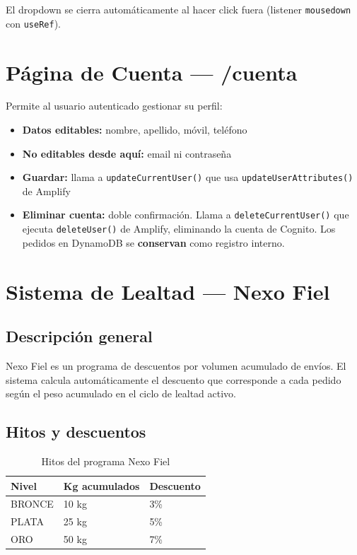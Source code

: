 \documentclass[12pt,a4paper]{article}
\begin{document}
El dropdown se cierra automáticamente al hacer click fuera (listener
\texttt{mousedown} con \texttt{useRef}).

\section{Página de Cuenta --- /cuenta}

Permite al usuario autenticado gestionar su perfil:

\begin{itemize}
  \item \textbf{Datos editables:} nombre, apellido, móvil, teléfono
  \item \textbf{No editables desde aquí:} email ni contraseña
  \item \textbf{Guardar:} llama a \texttt{updateCurrentUser()} que usa
    \texttt{updateUserAttributes()} de Amplify
  \item \textbf{Eliminar cuenta:} doble confirmación. Llama a \texttt{deleteCurrentUser()}
    que ejecuta \texttt{deleteUser()} de Amplify, eliminando la cuenta de Cognito.
    Los pedidos en DynamoDB se \textbf{conservan} como registro interno.
\end{itemize}

\section{Sistema de Lealtad --- Nexo Fiel}

\subsection{Descripción general}

Nexo Fiel es un programa de descuentos por volumen acumulado de envíos. El sistema
calcula automáticamente el descuento que corresponde a cada pedido según el peso
acumulado en el ciclo de lealtad activo.

\subsection{Hitos y descuentos}

\begin{table}[H]
\centering
\begin{tabular}{@{}lll@{}}
\toprule
\textbf{Nivel} & \textbf{Kg acumulados} & \textbf{Descuento} \\
\midrule
BRONCE & 10 kg & 3\% \\
PLATA  & 25 kg & 5\% \\
ORO    & 50 kg & 7\% \\
\bottomrule
\end{tabular}
\caption{Hitos del programa Nexo Fiel}
\end{table}
\end{document}

